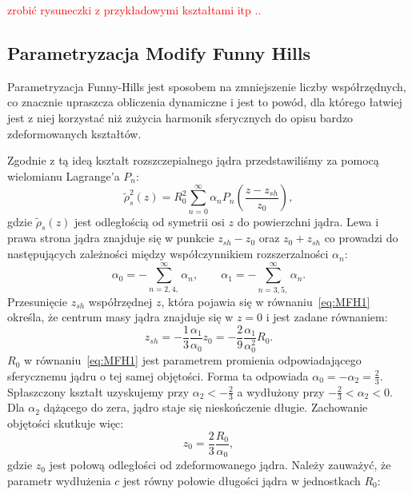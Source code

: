 \documentclass[polish]{article}
\numberwithin{equation}{section}
\begin{document}
\bigskip
\textcolor{red}{zrobić rysuneczki z przykładowymi kształtami itp ..}


\subsection{Parametryzacja Modify Funny Hills}

Parametryzacja Funny-Hills jest sposobem na zmniejszenie liczby współrzędnych, co znacznie upraszcza obliczenia dynamiczne i jest to powód, dla którego łatwiej jest z niej korzystać niż zużycia harmonik sferycznych do opisu bardzo zdeformowanych kształtów.

Zgodnie z tą ideą kształt rozszczepialnego jądra przedstawiliśmy za pomocą wielomianu Lagrange'a $P_{n}$:
\begin{equation} \label{eq:MFH1}
\tilde{\rho}^{2}_{s}(z)=R_{0}^{2}\sum_{n=0}^{\infty}\alpha_{n}P_{n}\left(\frac{z-z_{sh}}{z_{0}}\right),
\end{equation}
gdzie $\tilde{\rho}_{s}(z)$ jest odległością od symetrii osi $z$ do powierzchni jądra. Lewa i prawa strona jądra znajduje się w punkcie $z_{sh}-z_{0}$ oraz $z_{0}+z_{sh}$ co prowadzi do następujących zależności między współczynnikiem rozszerzalności $\alpha_{n}$:
\begin{equation} \label{eq:MFH2}
\alpha_{0}=-\sum_{n=2,4,}^{\infty}\alpha_{n}, \qquad \alpha_{1}=-\sum_{n=3,5,}^{\infty}\alpha_{n}.
\end{equation}
Przesunięcie $z_{sh}$ współrzędnej $z$, która pojawia się w równaniu~\ref{eq:MFH1} określa, że centrum masy jądra znajduje się w $z=0$ i jest zadane równaniem:
\begin{equation} \label{eq:MFH3}
z_{sh}=-\frac{1}{3}\frac{\alpha_{1}}{\alpha_{0}}z_{0}=-\frac{2}{9}\frac{\alpha_{1}}{\alpha_{0}^{2}}R_{0}.
\end{equation}
$R_{0}$ w równaniu~\ref{eq:MFH1} jest parametrem promienia odpowiadającego sferycznemu jądru o tej samej objętości. Forma ta odpowiada $\alpha_{0}=-\alpha_{2}=\frac{2}{3}$. Spłaszczony kształt uzyskujemy przy $\alpha_{2}<-\frac{2}{3}$ a wydłużony przy $-\frac{2}{3}<\alpha_{2}<0$. Dla $\alpha_{2}$ dążącego do zera, jądro staje się nieskończenie długie. Zachowanie objętości skutkuje więc:
\begin{equation} \label{eq:MFH4}
z_{0}=\frac{2}{3}\frac{R_{0}}{\alpha_{0}},
\end{equation}
gdzie $z_{0}$ jest połową odległości od zdeformowanego jądra. Należy zauważyć, że parametr wydłużenia $c$ jest równy połowie długości jądra w jednostkach $R_{0}$:
\end{document}
